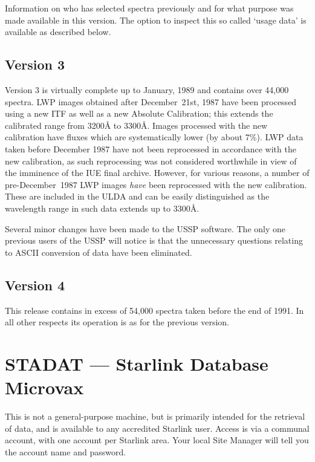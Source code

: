 Information on who has selected spectra previously and for what purpose was
made available in this version.
The option to inspect this so called `usage data'  is available
as described below.

\subsection{Version 3}

Version 3 is virtually complete up to January,  1989 and contains
over  44,000 spectra.
LWP images obtained after December~21st, 1987 have been processed using
a new  ITF  as  well  as  a  new  Absolute  Calibration;
this  extends  the  calibrated  range  from 3200{\AA}
to  3300{\AA}.
Images processed with the  new  calibration have fluxes which are
systematically lower (by about 7\%).
LWP data taken before December 1987 have not been reprocessed in
accordance with the new calibration, as
such reprocessing was not considered worthwhile in view
of the imminence of the IUE final archive.
However, for various reasons, a number of pre-December~1987 LWP images
{\sl have\/} been reprocessed with the new calibration.
These are included in the ULDA and can be easily distinguished as the
wavelength range  in such data extends up to 3300{\AA}.

Several minor changes have been made to the USSP software.
The only one previous
users of the USSP will notice is that the unnecessary questions relating to
ASCII conversion of data have been eliminated.

\subsection{Version 4}

This release contains in excess of 54,000 spectra taken before the
end of 1991. In all other respects its operation is as for the previous
version.



\section{STADAT --- Starlink Database Microvax}

This is not a general-purpose machine, but is primarily intended for the
retrieval of data, and is available to any accredited Starlink user.
Access is via a communal account, with one account
per Starlink area.
Your local Site Manager will tell you the account name and password.

